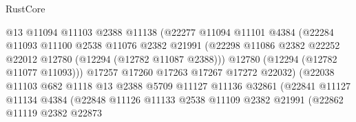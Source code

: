 \begin{lexlean}{RustCore}
\begin{coremodule}
                                    @13
                                    @11094
                                    @11103
                                    @2388
                                    @11138
                                    (@22277
                                      @11094
                                      @11101
                                      @4384
                                      (@22284
                                        @11093
                                        @11100
                                        @2538
                                        @11076
                                        @2382
                                        @21991
                                        (@22298
                                          @11086
                                          @2382
                                          @22252
                                          @22012
                                          @12780
                                          (@12294 (@12782 @11087 @2388)))
                                        @12780
                                        (@12294 (@12782 @11077 @11093)))
                                      @17257
                                      @17260
                                      @17263
                                      @17267
                                      @17272
                                      @22032)
                                    (@22038
                                      @11103
                                      @682
                                      @1118
                                      @13
                                      @2388
                                      @5709
                                      @11127
                                      @11136
                                      @32861
                                      (@22841
                                        @11127
                                        @11134
                                        @4384
                                        (@22848
                                          @11126
                                          @11133
                                          @2538
                                          @11109
                                          @2382
                                          @21991
                                          (@22862
                                            @11119
                                            @2382
                                            @22873

\end{coremodule}
\end{lexlean}
